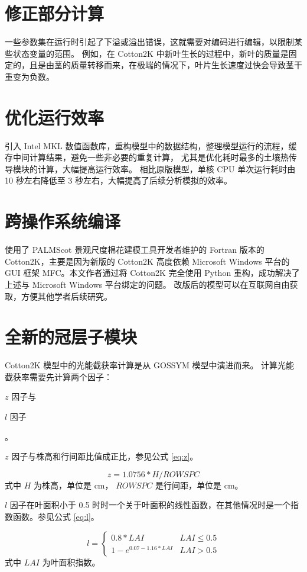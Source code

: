 \section{修正部分计算}
一些参数集在运行时引起了下溢或溢出错误，这就需要对编码进行编辑，以限制某些状态变量的范围。
例如，在 Cotton2K 中新叶生长的过程中，新叶的质量是固定的，且是由茎的质量转移而来，在极端的情况下，叶片生长速度过快会导致茎干重变为负数。

\section{优化运行效率}
引入 Intel MKL 数值函数库，重构模型中的数据结构，整理模型运行的流程，缓存中间计算结果，避免一些非必要的重复计算，%
尤其是优化耗时最多的土壤热传导模块的计算，大幅提高运行效率。
相比原版模型，单核 CPU 单次运行耗时由 10 秒左右降低至 3 秒左右，大幅提高了后续分析模拟的效率。

\section{跨操作系统编译}
 使用了 PALMScot 景观尺度棉花建模工具开发者维护的 Fortran 版本的 Cotton2K，主要是因为新版的 Cotton2K 高度依赖%
Microsoft Windows 平台的 GUI 框架 MFC。本文作者通过将 Cotton2K 完全使用 Python 重构，成功解决了上述与 Microsoft Windows 平台绑定的问题。
改版后的模型可以在互联网自由获取，方便其他学者后续研究。

\section{全新的冠层子模块}\label{sec:canopyLayering}
Cotton2K 模型中的光能截获率计算是从 GOSSYM 模型中演进而来。
计算光能截获率需要先计算两个因子：\begin{enumerate*}
    \item $z$ 因子与
    \item $l$ 因子
\end{enumerate*}。

$z$ 因子与株高和行间距比值成正比，参见公式 \ref{eq:z}。

\begin{equation}\label{eq:z}
    z = 1.0756 * H / ROWSPC
\end{equation}
式中 $H$ 为株高，单位是 cm， $ROWSPC$ 是行间距，单位是 cm。

$l$ 因子在叶面积小于 0.5 时时一个关于叶面积的线性函数，在其他情况时是一个指数函数。参见公式 \ref{eq:l}。

\begin{equation}\label{eq:l}
    l = \begin{cases}
        0.8 * LAI                 & LAI \le 0.5 \\
        1 - e^{0.07 - 1.16 * LAI} & LAI > 0.5
    \end{cases}
\end{equation}
式中 $LAI$ 为叶面积指数。

